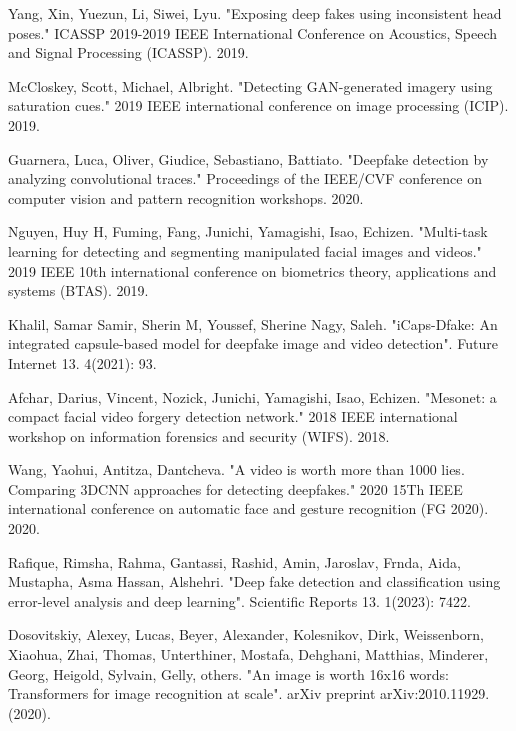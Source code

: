 \documentclass{svproc}
\begin{document}
\begin{thebibliography}{6}
Yang, Xin, Yuezun, Li, Siwei, Lyu. "Exposing deep fakes using inconsistent head poses." ICASSP 2019-2019 IEEE International Conference on Acoustics, Speech and Signal Processing (ICASSP). 2019.

McCloskey, Scott, Michael, Albright. "Detecting GAN-generated imagery using saturation cues." 2019 IEEE international conference on image processing (ICIP). 2019.

Guarnera, Luca, Oliver, Giudice, Sebastiano, Battiato. "Deepfake detection by analyzing convolutional traces." Proceedings of the IEEE/CVF conference on computer vision and pattern recognition workshops. 2020.

Nguyen, Huy H, Fuming, Fang, Junichi, Yamagishi, Isao, Echizen. "Multi-task learning for detecting and segmenting manipulated facial images and videos." 2019 IEEE 10th international conference on biometrics theory, applications and systems (BTAS). 2019.

Khalil, Samar Samir, Sherin M, Youssef, Sherine Nagy, Saleh. "iCaps-Dfake: An integrated capsule-based model for deepfake image and video detection". Future Internet 13. 4(2021): 93.

Afchar, Darius, Vincent, Nozick, Junichi, Yamagishi, Isao, Echizen. "Mesonet: a compact facial video forgery detection network." 2018 IEEE international workshop on information forensics and security (WIFS). 2018.

Wang, Yaohui, Antitza, Dantcheva. "A video is worth more than 1000 lies. Comparing 3DCNN approaches for detecting deepfakes." 2020 15Th IEEE international conference on automatic face and gesture recognition (FG 2020). 2020.

Rafique, Rimsha, Rahma, Gantassi, Rashid, Amin, Jaroslav, Frnda, Aida, Mustapha, Asma Hassan, Alshehri. "Deep fake detection and classification using error-level analysis and deep learning". Scientific Reports 13. 1(2023): 7422.

Dosovitskiy, Alexey, Lucas, Beyer, Alexander, Kolesnikov, Dirk, Weissenborn, Xiaohua, Zhai, Thomas, Unterthiner, Mostafa, Dehghani, Matthias, Minderer, Georg, Heigold, Sylvain, Gelly, others. "An image is worth 16x16 words: Transformers for image recognition at scale". arXiv preprint arXiv:2010.11929. (2020).


\end{thebibliography}
\end{document}
